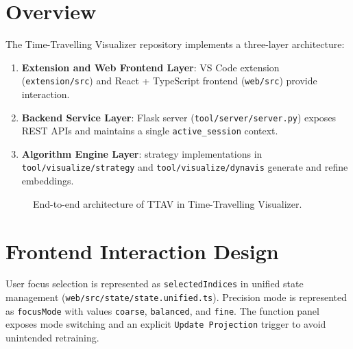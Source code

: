 \documentclass[12pt,a4paper]{report}
\newcommand{\systemname}{TTAV}
\newcommand{\projectname}{Time-Travelling Visualizer}
\begin{document}
\section{Overview}
The \projectname{} repository implements a three-layer architecture:
\begin{enumerate}
\item \textbf{Extension and Web Frontend Layer}: VS Code extension (\texttt{extension/src}) and React + TypeScript frontend (\texttt{web/src}) provide interaction.
\item \textbf{Backend Service Layer}: Flask server (\texttt{tool/server/server.py}) exposes REST APIs and maintains a single \texttt{active\_session} context.
\item \textbf{Algorithm Engine Layer}: strategy implementations in \texttt{tool/visualize/strategy} and \texttt{tool/visualize/dynavis} generate and refine embeddings.
\end{enumerate}

\begin{figure}[htbp]
\centering
{}
\caption{End-to-end architecture of \systemname{} in \projectname{}.}
\label{fig:architecture}
\end{figure}

\section{Frontend Interaction Design}
User focus selection is represented as \texttt{selectedIndices} in unified state management (\texttt{web/src/state/state.unified.ts}). Precision mode is represented as \texttt{focusMode} with values \texttt{coarse}, \texttt{balanced}, and \texttt{fine}. The function panel exposes mode switching and an explicit \texttt{Update Projection} trigger to avoid unintended retraining.
\end{document}
